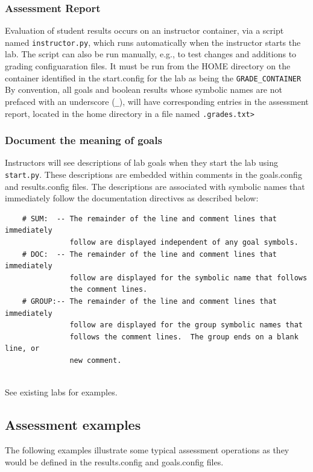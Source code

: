\documentclass[12pt]{article}
\begin{document}
\subsubsection{Assessment Report}
Evaluation of student results occurs on an instructor container, via a script named {\tt instructor.py}, which runs
automatically when the instructor starts the lab.  The script can also be run manually, e.g., to
test changes and additions to grading configuaration files.  It must be run from the HOME directory
on the container identified in the start.config for the lab as being the {\tt GRADE\_CONTAINER}
By convention, all goals and boolean results whose symbolic names are not prefaced with an
underscore ({\tt\_}), will have corresponding entries in the assessment report, located in 
the home directory in a file named {\tt <lab name>.grades.txt>}

\subsubsection{Document the meaning of goals}
\label{document goals}
Instructors will see descriptions of lab goals when they start the lab using {\tt start.py}.
These descriptions are embedded within comments in the goals.config and results.config files.
The descriptions are associated with symbolic names that immediately follow the documentation
directives as described below:
\begin{verbatim}
    # SUM:  -- The remainder of the line and comment lines that immediately
               follow are displayed independent of any goal symbols.
    # DOC:  -- The remainder of the line and comment lines that immediately 
               follow are displayed for the symbolic name that follows
               the comment lines.
    # GROUP:-- The remainder of the line and comment lines that immediately 
               follow are displayed for the group symbolic names that 
               follows the comment lines.  The group ends on a blank line, or 
               new comment.
   
\end{verbatim} 
\noindent See existing labs for examples.


\subsection{Assessment examples}
\label{examples}
The following examples illustrate some typical assessment operations as they would
be defined in the results.config and goals.config files.
\end{document}
